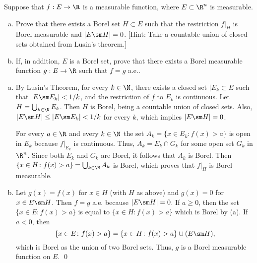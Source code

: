 \begin{hwsol}
Suppose that $f: E \to \R$ is a measurable function, where $E \subset \R^n$ is measurable. 
	\begin{enumerate}[(a)]
	\item Prove that there exists a Borel set $H \subset E$ such that the restriction $f\big|_H$ is Borel measurable and $|E \sm H|=0$. [Hint: Take a countable union of closed sets obtained from Lusin's theorem.] 
	\item If, in addition, $E$ is a Borel set, prove that there exists a Borel measurable function $g: E \to \R$ such that $f=g$ a.e.. \\
	\end{enumerate}

\pf \hfill
\begin{enumerate}[(a)]
\item By Lusin's Theorem, for every $k \in \N$, there exists a closed set $|E_k \subset E$ such that $|E \sm E_k| < 1/k$, and the restriction of $f$ to $E_k$ is continuous. Let $H= \bigcup_{k \in \N} E_k$. Then $H$ is Borel, being a countable union of closed sets. Also, $|E \sm H| \leq |E \sm E_k|<1/k$ for every $k$, which implies $|E \sm H|=0$.

For every $a \in \R$ and every $k \in \N$ the set $A_k =  \{ x \in E_k \colon f(x)>a \}$ is open in $E_k$ because $f\big|_{E_k}$ is continuous. Thus, $A_k = E_k \cap G_k$ for some open set $G_k$ in $\R^n$. Since both $E_k$ and $G_k$ are Borel, it follows that $A_k$ is Borel. Then $\{ x \in H \colon f(x)>a \}= \bigcup_{k \in \N} A_k$ is Borel, which proves that $f\big|_H$ is Borel measurable. 

\item Let $g(x) = f(x)$ for $x \in H$ (with $H$ as above) and $g(x)= 0$ for $x \in E \sm H$. Then $f=g$ a.e. because $|E \sm H|= 0$. If $a \geq 0$, then the set $\{ x \in E \colon  f(x) > a \}$ is equal to $\{ x \in H \colon f(x) > a \}$ which is Borel by (a). If $a<0$, then 
        \[
        \{ x \in E \colon f(x) > a \}= \{ x \in H \colon f(x) > a \} \cup ( E \sm H ),
        \]
which is Borel as the union of two Borel sets. Thus, $g$ is a Borel measurable function on $E$.  \qed \\
\end{enumerate}
\end{hwsol}


